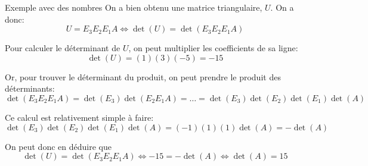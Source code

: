 \documentclass[a4paper]{article}
\begin{document}
\begin{parag}{Exemple avec des nombres}
    On a bien obtenu une matrice triangulaire, $U$. On a donc:
    \[U = E_3 E_2 E_1 A \iff \det\left(U\right) = \det\left(E_3 E_2 E_1 A\right)\]

    Pour calculer le déterminant de $U$, on peut multiplier les coefficients de sa ligne:
    \[\det\left(U\right) = \left(1\right)\left(3\right)\left(-5\right) = -15\]

    Or, pour trouver le déterminant du produit, on peut prendre le produit des déterminants:
    \[\det\left(E_3 E_2 E_1 A\right) = \det\left(E_3\right)\det\left(E_2 E_1 A\right) = \ldots = \det\left(E_3\right)\det\left(E_2\right)\det\left(E_1\right)\det\left(A\right)\]

    Ce calcul est relativement simple à faire:
    \[\det\left(E_3\right)\det\left(E_2\right)\det\left(E_1\right)\det\left(A\right) = \left(-1\right)\left(1\right)\left(1\right)\det\left(A\right) = -\det\left(A\right)\]


    On peut donc en déduire que
    \[\det\left(U\right) = \det\left(E_3 E_2 E_1 A\right) \iff -15 = -\det\left(A\right) \iff \det\left(A\right) = 15\]
\end{parag}
\end{document}
